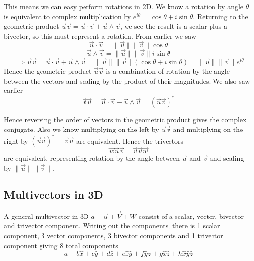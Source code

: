 \documentclass[options]{report}
\def \u{\vec{u}}
\def \v{\vec{v}}
\def \w{\vec{w}}
\def \xhat{\hat{x}}
\def \yhat{\hat{y}}
\def \zhat{\hat{z}}
\newcommand{\norm}[1]{\lVert #1 \rVert}
\begin{document}
This means we can easy perform rotations in 2D. We know a rotation by angle $\theta$ is equivalent to complex multiplication by $e^{i\theta} = \cos \theta + i \sin \theta$. Returning to the geometric product $\u \v = \u \cdot \v + \u \wedge \v$, we see the result is a scalar plus a bivector, so this must represent a rotation. From earlier we saw
\begin{equation*}
	\u \cdot \v = \norm{\u} \norm{\v} \cos \theta
\end{equation*}
\begin{equation*}
	\u \wedge \v = \norm{\u} \norm{\v} i \sin \theta
\end{equation*}
\begin{equation}
	\implies \u \v = \u \cdot \v + \u \wedge \v = \norm{\u} \norm{\v} \left( \cos \theta + i \sin \theta \right) = \norm{\u} \norm{\v} e^{i \theta}
\end{equation}
Hence the geometric product $\u \v$ is a combination of rotation by the angle between the vectors and scaling by the product of their magnitudes. We also saw earlier
\begin{equation}
	\v \u = \u \cdot \v - \u \wedge \v = \left( \u \v \right)^*
\end{equation}

Hence reversing the order of vectors in the geometric product gives the complex conjugate. Also we know multiplying on the left by $\u \v$ and multiplying on the right by $\left( \u \v \right)^* = \v \u$ are equivalent. Hence the trivectors
\begin{equation}
	\w \u \v = \v \u \w
\end{equation}
are equivalent, representing rotation by the angle between $\u$ and $\v$ and scaling by $\norm{\u} \norm{\v}$.

\subsection{Multivectors in 3D}
A general multivector in 3D $a + \u + \vec{V} + W$ consist of a scalar, vector, bivector and trivector component. Writing out the components, there is 1 scalar component, 3 vector components, 3 bivector components and 1 trivector component giving 8 total components
\begin{equation}
	a + b \xhat + c \yhat + d \zhat + e \xhat \yhat + f \yhat \zhat + g \xhat \zhat + h \xhat \yhat \zhat
\end{equation}
\end{document}
